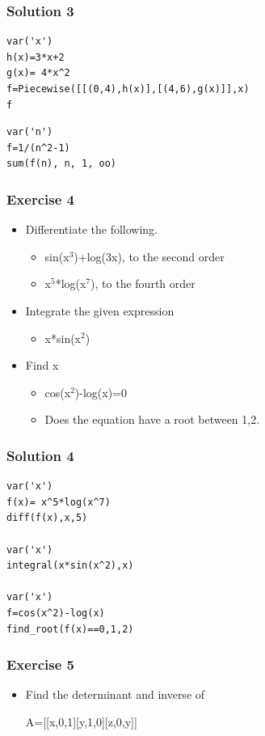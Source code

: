 \documentclass[presentation]{beamer}
\begin{document}
\begin{frame}[fragile]
\frametitle{Solution 3}
\label{sec-9}

\lstset{language=Python}
\begin{lstlisting}
var('x') 
h(x)=3*x+2 
g(x)= 4*x^2
f=Piecewise([[(0,4),h(x)],[(4,6),g(x)]],x)
f
\end{lstlisting}

\lstset{language=Python}
\begin{lstlisting}
var('n')
f=1/(n^2-1) 
sum(f(n), n, 1, oo)
\end{lstlisting}
\end{frame}
\begin{frame}
\frametitle{Exercise 4}
\label{sec-10}


\begin{itemize}
\item Differentiate the following.
\begin{itemize}
\item sin(x$^3$)+log(3x), to the second order
\item x$^5$*log(x$^7$), to the fourth order
\end{itemize}
\vspace{4pt}
\item Integrate the given expression
\begin{itemize}
\item x*sin(x$^2$)
\end{itemize}
\vspace{4pt}
\item Find x
\begin{itemize}
\item cos(x$^2$)-log(x)=0
\item Does the equation have a root between 1,2.
\end{itemize}
\end{itemize}
\end{frame}
\begin{frame}[fragile]
\frametitle{Solution 4}
\label{sec-11}

\lstset{language=Python}
\begin{lstlisting}
var('x')
f(x)= x^5*log(x^7) 
diff(f(x),x,5)

var('x')
integral(x*sin(x^2),x) 

var('x')
f=cos(x^2)-log(x)
find_root(f(x)==0,1,2)
\end{lstlisting}
\end{frame}
\begin{frame}
\frametitle{Exercise 5}
\label{sec-12}


\begin{itemize}
\item Find the determinant and inverse of 

      A=[[x,0,1][y,1,0][z,0,y]]
\end{itemize}
\end{frame}
\end{document}
